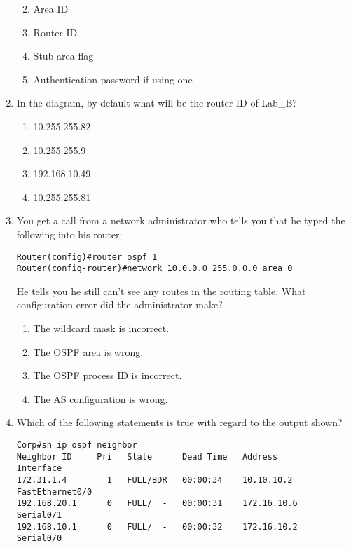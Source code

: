 \begin{enumerate}
  \begin{enumerate}
  \def\labelenumii{\Alph{enumii}.}
  \tightlist
  \item
    Area ID
  \item
    Router ID
  \item
    Stub area flag
  \item
    Authentication password if using one
  \end{enumerate}
\item
  In the diagram, by default what will be the router ID of Lab\_B?

  \begin{figure}
  \centering
  \caption{}
  \end{figure}

  \begin{enumerate}
  \def\labelenumii{\Alph{enumii}.}
  \tightlist
  \item
    10.255.255.82
  \item
    10.255.255.9
  \item
    192.168.10.49
  \item
    10.255.255.81
  \end{enumerate}
\item
  You get a call from a network administrator who tells you that he
  typed the following into his router:

\begin{verbatim}
Router(config)#router ospf 1
Router(config-router)#network 10.0.0.0 255.0.0.0 area 0
\end{verbatim}

  He tells you he still can't see any routes in the routing table. What
  configuration error did the administrator make?

  \begin{enumerate}
  \def\labelenumii{\Alph{enumii}.}
  \tightlist
  \item
    The wildcard mask is incorrect.
  \item
    The OSPF area is wrong.
  \item
    \protect\hypertarget{c18.xhtmlux5cux23Page_778}{}{}The OSPF process
    ID is incorrect.
  \item
    The AS configuration is wrong.
  \end{enumerate}
\item
  Which of the following statements is true with regard to the output
  shown?

\begin{verbatim}
Corp#sh ip ospf neighbor
Neighbor ID     Pri   State      Dead Time   Address         Interface
172.31.1.4        1   FULL/BDR   00:00:34    10.10.10.2     FastEthernet0/0
192.168.20.1      0   FULL/  -   00:00:31    172.16.10.6     Serial0/1
192.168.10.1      0   FULL/  -   00:00:32    172.16.10.2     Serial0/0
\end{verbatim}


\end{enumerate}
